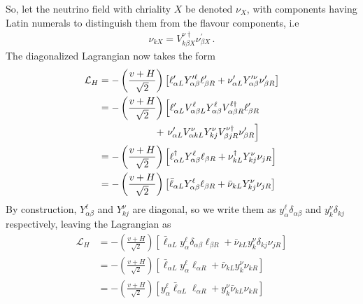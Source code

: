 \documentclass[draft=True]{revtex4-2}
\begin{document}
So, let the neutrino field with chriality $X$ be denoted $\nu_X$, with components having Latin numerals to distinguish them from the flavour components, i.e 
\begin{align}\label{eq:nu_rotation}
    \nu_{k X} =  V_{k\beta X}^{\nu \dagger} \nu_{\beta X}^\prime\,.
\end{align}
The diagonalized Lagrangian now takes the form 
\begin{align}
    \mathcal{L}_{H} &= -\left( \frac{v + H}{\sqrt{2}} \right) \left[\ell_{\alpha L}^{\prime} Y_{\alpha \beta}^{\prime \ell} \ell_{\beta R}^{\prime} + \nu_{\alpha L}^{\prime} Y_{\alpha \beta}^{\prime \nu} \nu_{\beta R}^{\prime}\right] \nonumber \\
    &= -\left( \frac{v + H}{\sqrt{2}} \right) \left[\ell_{\alpha L}^{\prime} V_{\alpha \beta L}^{\ell} Y_{\alpha \beta}^{ \ell} V_{\alpha \beta R}^{\ell \dagger} \ell_{\beta R}^{\prime}\right. \nonumber \\
    &\hspace{5.7em}+\left. \nu_{\alpha L}^{\prime} V_{\alpha k L}^{\nu} Y_{kj}^{\nu} V_{\beta j  R}^{\nu \dagger} \nu_{\beta R}^{\prime}\right] \nonumber \\
    &= -\left( \frac{v + H}{\sqrt{2}} \right) \left[\ell_{\alpha L}^\dagger Y_{\alpha \beta}^{ \ell} \ell_{\beta R} + \nu_{k L}^{\dagger} Y_{kj}^{ \nu} \nu_{j R}\right] \nonumber \\
    &= -\left( \frac{v + H}{\sqrt{2}} \right) \left[\bar{\ell}_{\alpha L} Y_{\alpha \beta}^{ \ell} \ell_{\beta R} + \bar{\nu}_{k L} Y_{kj}^\nu \nu_{j R}\right]
\end{align}
By construction, $Y^\ell_{\alpha \beta}$ and $Y^\nu_{kj}$ are diagonal, so we write them as $y_{\alpha}^{\ell} \delta_{\alpha \beta}$ and $y_{k}^{\nu} \delta_{k j}$ respectively, leaving the Lagrangian as 
\begin{align}\label{eq:L_H}
    \mathcal{L}_{H} 
    &=-\left( \frac{v + H}{\sqrt{2}} \right) \left[\bar{\ell}_{\alpha L} y_{\alpha}^{\ell} \delta_{\alpha \beta} \ell_{\beta R} + \bar{\nu}_{k L} y_{k}^{\nu} \delta_{k j} \nu_{j R}\right] \nonumber \\
    &=-\left( \frac{v + H}{\sqrt{2}} \right) \left[\bar{\ell}_{\alpha L} y_{\alpha}^{\ell}  \ell_{\alpha R} + \bar{\nu}_{k L} y_{k}^{\nu} \nu_{k R}\right] \nonumber \\
    &=-\left( \frac{v + H}{\sqrt{2}} \right) \left[ y_{\alpha}^{\ell}  \bar{\ell}_{\alpha L}\ell_{\alpha R} +  y_{k}^{\nu}\bar{\nu}_{k L} \nu_{k R}\right] 
\end{align}
\end{document}
